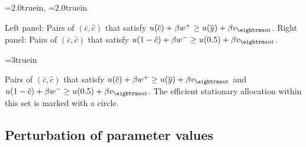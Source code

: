 



\centerline{\epsfxsize=2.0truein, \epsfxsize=2.0truein}
\caption{Left panel: Pairs
of $(\overline c, \hat c)$ that satisfy
$u(\overline c) + \beta w^+ \geq u(\overline y)
  + \beta v_{\rm aut}$.  Right panel: Pairs of
$(\overline c, \hat c)$ that satisfy $u(1-\hat c) + \beta w^- \geq
u(0.5)
  + \beta v_{\rm aut}$. }
\endfigure
\medskip
%





\centerline{\epsfxsize=3truein}
\caption{Pairs of $(\overline c, \hat c)$ that satisfy
$u(\overline c) + \beta w^+ \geq u(\overline y)
  + \beta v_{\rm aut}$ and $u(1-\hat c) + \beta w^- \geq u(0.5)
+ \beta v_{\rm aut}$.  The efficient stationary allocation
within this set is marked with a circle.}
\endfigure

\subsection{Perturbation of parameter values}

